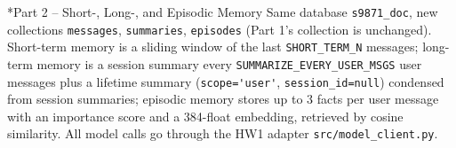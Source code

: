 \documentclass[11pt]{article}
\makeatletter
\renewcommand\section{\@startsection{section}{1}{\z@}{-3.0ex \@plus -1ex \@minus -.2ex}{1.2ex \@plus.2ex}{\normalfont\fontsize{14}{17}\selectfont\bfseries}}
\makeatother
\begin{document}
\section*{Part 2 -- Short-, Long-, and Episodic Memory}
Same database \verb|s9871_doc|, new collections \verb|messages|, \verb|summaries|, \verb|episodes| (Part 1's collection is unchanged). Short-term memory is a sliding window of the last \verb|SHORT_TERM_N| messages; long-term memory is a session summary every \verb|SUMMARIZE_EVERY_USER_MSGS| user messages plus a lifetime summary (\verb|scope='user'|, \verb|session_id=null|) condensed from session summaries; episodic memory stores up to 3 facts per user message with an importance score and a 384-float embedding, retrieved by cosine similarity. All model calls go through the HW1 adapter \verb|src/model_client.py|.
\end{document}
